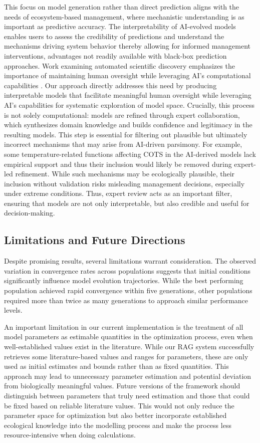 This focus on model generation rather than direct prediction aligns with the needs of ecosystem-based management, where mechanistic understanding is as important as predictive accuracy. The interpretability of AI-evolved models enables users to assess the credibility of predictions and understand the mechanisms driving system behavior thereby allowing for informed management interventions, advantages not readily available with black-box prediction approaches. Work examining automated scientific discovery emphasizes the importance of maintaining human oversight while leveraging AI's computational capabilities \citep{kramer2023automated,Spillias2024}. Our approach directly addresses this need by producing interpretable models that facilitate meaningful human oversight while leveraging AI's capabilities for systematic exploration of model space. Crucially, this process is not solely computational: models are refined through expert collaboration, which synthesizes domain knowledge and builds confidence and legitimacy in the resulting models. This step is essential for filtering out plausible but ultimately incorrect mechanisms that may arise from AI-driven parsimony. For example, some temperature-related functions affecting COTS in the AI-derived models lack empirical support and thus their inclusion would likely be removed during expert-led refinement. While such mechanisms may be ecologically plausible, their inclusion without validation risks misleading management decisions, especially under extreme conditions. Thus, expert review acts as an important filter, ensuring that models are not only interpretable, but also credible and useful for decision-making.

\subsection{Limitations and Future Directions}

Despite promising results, several limitations warrant consideration. The observed variation in convergence rates across populations suggests that initial conditions significantly influence model evolution trajectories. While the best performing population achieved rapid convergence within five generations, other populations required more than twice as many generations to approach similar performance levels. 

An important limitation in our current implementation is the treatment of all model parameters as estimable quantities in the optimization process, even when well-established values exist in the literature. While our RAG system successfully retrieves some literature-based values and ranges for parameters, these are only used as initial estimates and bounds rather than as fixed quantities. This approach may lead to unnecessary parameter estimation and potential deviation from biologically meaningful values. Future versions of the framework should distinguish between parameters that truly need estimation and those that could be fixed based on reliable literature values. This would not only reduce the parameter space for optimization but also better incorporate established ecological knowledge into the modelling process and make the process less resource-intensive when doing calculations.

